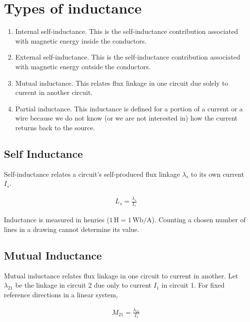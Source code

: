 \documentclass{ximera}
\begin{document}
\section{Types of inductance}

\begin{enumerate}
\item Internal self-inductance. This is the self-inductance contribution associated with magnetic energy inside the conductors.
\item External self-inductance. This is the self-inductance contribution associated with magnetic energy outside the conductors.
\item Mutual inductance. This relates flux linkage in one circuit due solely to current in another circuit.
\item Partial inductance. This inductance is defined for a portion of a current or a wire because we do not know (or we are not interested in) how the current returns back to the source.
\end{enumerate}






\subsection{Self Inductance}


Self-inductance relates a circuit's self-produced flux linkage $\lambda_s$ to its own current $I_s$.
 
 \begin{eqnarray}
 L_s=\frac{\lambda_s}{I_s}
 \end{eqnarray}
 
Inductance is measured in henries ($1\,\mathrm{H}=1\,\mathrm{Wb}/\mathrm{A}$). Counting a chosen number of lines in a drawing cannot determine its value.

\subsection{Mutual Inductance}

Mutual inductance relates flux linkage in one circuit to current in another. Let $\lambda_{21}$ be the linkage in circuit 2 due only to current $I_1$ in circuit 1. For fixed reference directions in a linear system,
 
 \begin{eqnarray}
 M_{21}=\frac{\lambda_{21}}{I_1}
 \end{eqnarray}
\end{document}
